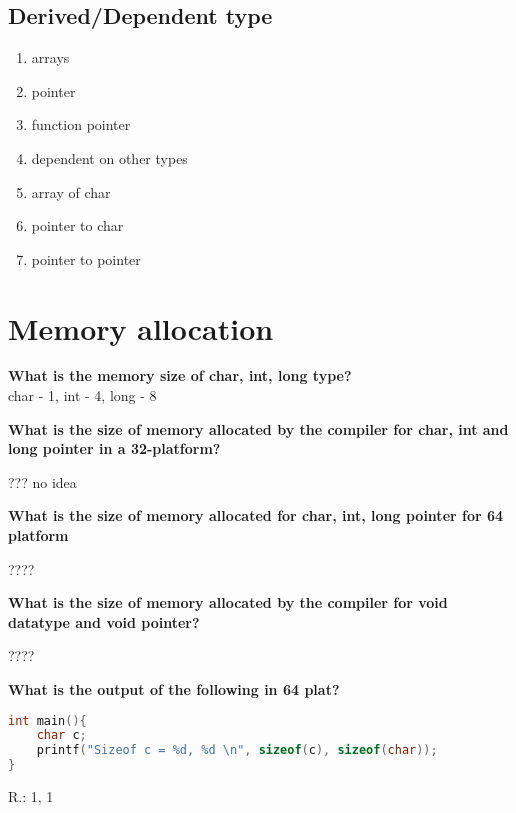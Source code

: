 \documentclass[12pt]{article}
\begin{document}
\newpage

\subsection{Derived/Dependent type}%
\label{sub:Derived/Dependent type}

\begin{enumerate}
	\item arrays
	\item pointer
	\item function pointer
	\item dependent on other types
	\item array of char
	\item pointer to char
	\item pointer to pointer
\end{enumerate}


\newpage

\section{Memory allocation}
\indent
\textbf{What is the memory size of char, int, long type?} \\
char - 1, int - 4, long - 8

\bigskip

\textbf{What is the size of memory allocated by the compiler for char, int and long pointer in a 32-platform?}

??? no idea


\vspace{10mm}
\textbf{What is the size of memory allocated for char, int, long pointer for 64 platform}

????


\vspace{10mm}

\textbf{What is the size of memory allocated by the compiler for void datatype and void pointer?}

????

\vspace{10mm}

\textbf{What is the output of the following in 64 plat?}

\begin{lstlisting}[language=C, title=sizeof cenas]
int main(){
	char c;
	printf("Sizeof c = %d, %d \n", sizeof(c), sizeof(char));
}
\end{lstlisting}
R.: 1, 1

\newpage
\end{document}
